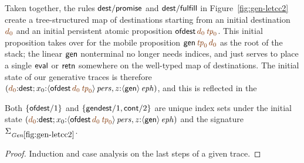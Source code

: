 Taken together, the rules ${\sf dest/promise}$ and ${\sf
  dest/fulfill}$ in Figure~\ref{fig:gen-letcc2} create a
tree-structured map of destinations starting from an initial
destination $\lf{d_0}$ and an initial persistent atomic proposition
${\sf ofdest}\,\lf{d_0}\,\lf{{\it tp}_0}$. This initial proposition
takes over for the mobile proposition ${\sf gen}\,\lf{{\it
    tp}_0}\,\lf{d_0}$ as the root of the stack; the linear ${\sf gen}$
nonterminal no longer needs indices, and just serves to place a single
${\sf eval}$ or ${\sf retn}$ somewhere on the well-typed map of
destinations. The initial state of our generative traces is therefore
$\left(\lf{d_0}{:}{\sf dest}; x_0{:}\ispers{\susp{{\sf
        ofdest}\,\lf{d_0}\,\lf{{\it tp}_0}}}, z{:}\iseph{\susp{{\sf
        gen}}}\right)$, and this is reflected in the 

\bigskip
\begin{lemma} Both $\{ {\sf
    ofdest}/1 \}$ and $\{ {\sf gendest}/1, {\sf cont}/2 \}$ are unique
  index sets under the initial state
  $\left(\lf{d_0}{:}{\sf dest}; x_0{:}\ispers{\susp{{\sf
          ofdest}\,\lf{d_0}\,\lf{{\it tp}_0}}}, z{:}\iseph{\susp{{\sf gen}}}\right)$ and the signature $\siggenletcc$.
\end{lemma}

\begin{proof}
Induction and case analysis on the last steps of a given trace.
\end{proof}

